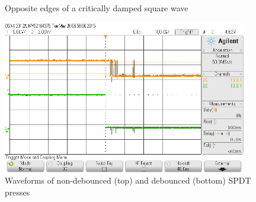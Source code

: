 \documentclass[11pt]{article}
\begin{document}
\begin{figure}[h]
	\centering
	\caption{Opposite edges of a critically damped square wave}
	\label{fig:rise_fall}
\end{figure}

\begin{figure}[h]
	\centering
	\includegraphics[width=0.95\textwidth, draft=false]{debounce}
	\caption{Waveforms of non-debounced (top) and debounced (bottom) SPDT presses}
	\label{fig:debounce}
\end{figure}
\end{document}
